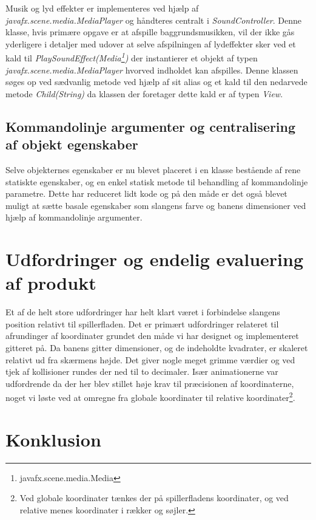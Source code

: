 \documentclass[]{article}
\begin{document}
	Musik og lyd effekter er implementeres ved hjælp af \textit{javafx.scene.media.MediaPlayer} og håndteres centralt i \textit{SoundController}. Denne klasse, hvis primære opgave er at afspille baggrundsmusikken, vil der ikke gås yderligere i detaljer med udover at selve afspilningen af lydeffekter sker ved et kald til \textit{PlaySoundEffect(Media\footnote{javafx.scene.media.Media})} der instantierer et objekt af typen \textit{javafx.scene.media.MediaPlayer} hvorved indholdet kan afspilles. Denne klassen søges op ved sædvanlig metode ved hjælp af sit alias og et kald til den nedarvede metode \textit{Child(String)} da klassen der foretager dette kald er af typen \textit{View}.
	
	\subsection{Kommandolinje argumenter og centralisering af objekt egenskaber}
	
	Selve objekternes egenskaber er nu blevet placeret i en klasse bestående af rene statiskte egenskaber, og en enkel statisk metode til behandling af kommandolinje parametre. Dette har reduceret lidt kode og på den måde er det også blevet muligt at sætte basale egenskaber som slangens farve og banens dimensioner ved hjælp af kommandolinje argumenter.  
	

\section{Udfordringer og endelig evaluering af produkt}

Et af de helt store udfordringer har helt klart været i forbindelse slangens position relativt til spillerfladen. Det er primært udfordringer relateret til afrundinger af koordinater grundet den måde vi har designet og implementeret gitteret på. Da banens gitter dimensioner, og de indeholdte kvadrater, er skaleret relativt ud fra skærmens højde. Det giver nogle meget grimme værdier og ved tjek af kollisioner rundes der ned til to decimaler. Især animationerne var udfordrende da der her blev stillet høje krav til præcisionen af koordinaterne, noget vi løste ved at omregne fra globale koordinater til relative koordinater\footnote{Ved globale koordinater tænkes der på spillerfladens koordinater, og ved relative menes koordinater i rækker og søjler.}.


\section{Konklusion}
\end{document}

